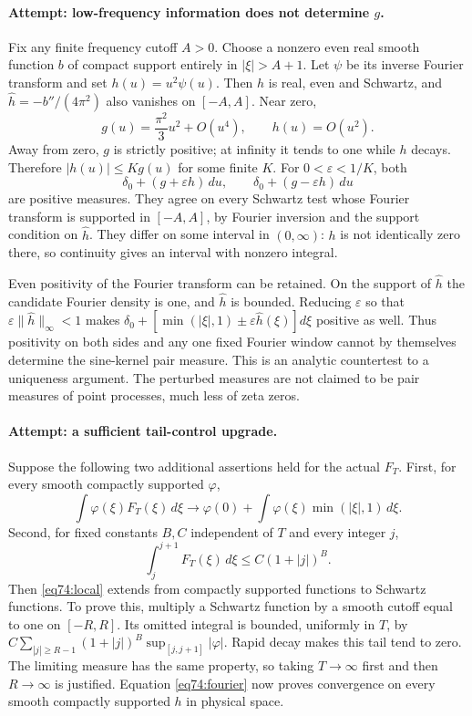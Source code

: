 \documentclass[11pt,a4paper]{article}
\numberwithin{equation}{section}
\begin{document}
\paragraph{Attempt: low-frequency information does not determine $g$.}
Fix any finite frequency cutoff $A>0$. Choose a nonzero even real smooth
function $b$ of compact support entirely in $|\xi|>A+1$. Let $\psi$ be its
inverse Fourier transform and set $h(u)=u^2\psi(u)$. Then $h$ is real,
even and Schwartz, and $\widehat h=-b''/(4\pi^2)$ also vanishes on
$[-A,A]$. Near zero,
\[
 g(u)=\frac{\pi^2}{3}u^2+O(u^4),\qquad h(u)=O(u^2).
\]
Away from zero, $g$ is strictly positive; at infinity it tends to one
while $h$ decays. Therefore $|h(u)|\leq K g(u)$ for some finite $K$.
For $0<\varepsilon<1/K$, both
\begin{equation}\label{eq74:perturb}
 \delta_0+(g+\varepsilon h)\,du,
 \qquad \delta_0+(g-\varepsilon h)\,du
\end{equation}
are positive measures. They agree on every Schwartz test whose Fourier
transform is supported in $[-A,A]$, by Fourier inversion and the support
condition on $\widehat h$. They differ on some interval in $(0,\infty)$:
$h$ is not identically zero there, so continuity gives an interval with
nonzero integral.

Even positivity of the Fourier transform can be retained. On the support
of $\widehat h$ the candidate Fourier density is one, and $\widehat h$
is bounded. Reducing $\varepsilon$ so that
$\varepsilon\|\widehat h\|_\infty<1$ makes
$\delta_0+[\min(|\xi|,1)\pm\varepsilon\widehat h(\xi)]d\xi$
positive as well. Thus positivity on both sides and any one fixed Fourier
window cannot by themselves determine the sine-kernel pair measure.
This is an analytic countertest to a uniqueness argument. The perturbed
measures are not claimed to be pair measures of point processes, much
less of zeta zeros.

\paragraph{Attempt: a sufficient tail-control upgrade.}
Suppose the following two additional assertions held for the actual
$F_T$. First, for every smooth compactly supported $\varphi$,
\begin{equation}\label{eq74:local}
 \int\varphi(\xi)F_T(\xi)\,d\xi\longrightarrow
 \varphi(0)+\int\varphi(\xi)\min(|\xi|,1)\,d\xi.
\end{equation}
Second, for fixed constants $B,C$ independent of $T$ and every integer $j$,
\begin{equation}\label{eq74:tail}
 \int_j^{j+1}F_T(\xi)\,d\xi\leq C(1+|j|)^B.
\end{equation}
Then \eqref{eq74:local} extends from compactly supported functions to
Schwartz functions. To prove this, multiply a Schwartz function by a
smooth cutoff equal to one on $[-R,R]$. Its omitted integral is bounded,
uniformly in $T$, by
$C\sum_{|j|\geq R-1}(1+|j|)^B\sup_{[j,j+1]}|\varphi|$.
Rapid decay makes this tail tend to zero. The limiting measure has the
same property, so taking $T\to\infty$ first and then $R\to\infty$ is
justified. Equation \eqref{eq74:fourier} now proves convergence on every
smooth compactly supported $h$ in physical space.
\end{document}
